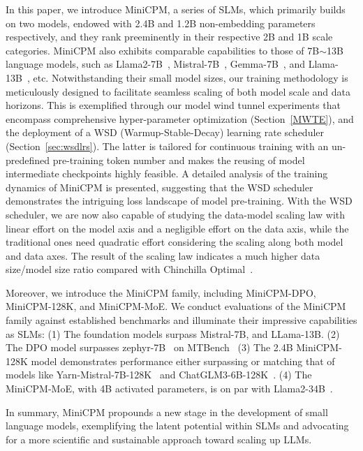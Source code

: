 \documentclass[dvipsnames]{article}
\begin{document}
In this paper, we introduce MiniCPM, a series of SLMs, which primarily builds on two models, endowed with 2.4B and 1.2B non-embedding parameters respectively, and they rank preeminently in their respective 2B and 1B scale categories. MiniCPM also exhibits comparable capabilities to those of 7B$\sim$13B language models, such as Llama2-7B~\citep{touvron2023llama}, Mistral-7B~\citep{jiang2023mistral}, Gemma-7B~\citep{Banks2024Gemma}, and Llama-13B~\citep{touvron2023llama}, etc.  Notwithstanding their small model sizes, our training methodology is meticulously designed to facilitate seamless scaling of both model scale and data horizons. This is exemplified through our model wind tunnel experiments that encompass comprehensive hyper-parameter optimization (Section~\ref{MWTE}), and the deployment of a WSD (Warmup-Stable-Decay) learning rate scheduler (Section~\ref{sec:wsdlrs}). The latter is tailored for continuous training with an un-predefined pre-training token number and makes the reusing of model intermediate checkpoints highly feasible. A detailed analysis of the training dynamics of MiniCPM is presented, suggesting that the WSD scheduler demonstrates the intriguing loss landscape of model pre-training. With the WSD scheduler, we are now also capable of studying the data-model scaling law with linear effort on the model axis and a negligible effort on the data axis, while the traditional ones need quadratic effort considering the scaling along both model and data axes. The result of the scaling law indicates a much higher data size/model size ratio compared with Chinchilla Optimal~\citep{hoffmann2022training}.

Moreover, we introduce the MiniCPM family, including MiniCPM-DPO, MiniCPM-128K, and MiniCPM-MoE. We conduct evaluations of the MiniCPM family against established benchmarks and illuminate their impressive capabilities as SLMs: (1) The foundation models surpass Mistral-7B, and LLama-13B. (2) The DPO model surpasses zephyr-7B~\citep{tunstall2023zephyr} on MTBench~\citep{zheng2024judging} (3) The 2.4B MiniCPM-128K model demonstrates performance either surpassing or matching that of models like Yarn-Mistral-7B-128K~\citep{peng2023yarn} and ChatGLM3-6B-128K~\citep{du2021glm}. (4) The MiniCPM-MoE, with 4B activated parameters, is on par with Llama2-34B~\citep{touvron2023llama}.

In summary, MiniCPM propounds a new stage in the development of small language models, exemplifying the latent potential within SLMs and advocating for a more scientific and sustainable approach toward scaling up LLMs. 
\end{document}
